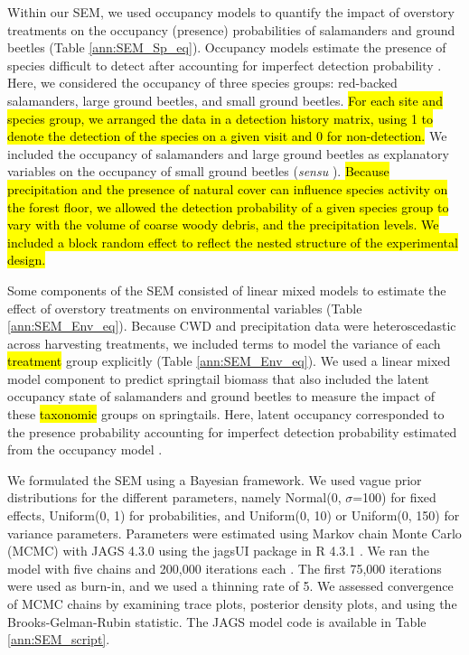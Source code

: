 Within our SEM, we used occupancy models to quantify the impact of overstory treatments on the occupancy (presence) probabilities of salamanders and ground beetles (Table \ref{ann:SEM_Sp_eq}). 
Occupancy models estimate the presence of species difficult to detect after accounting for imperfect detection probability \citep{mackenzieEstimatingSiteOccupancy2002,baileyEstimatingSiteOccupancy2004,mazerolleMakingGreatLeaps2007,spiersEstimatingSpeciesMisclassification2022}. 
Here, we considered the occupancy of three species groups: red-backed salamanders, large ground beetles, and small ground beetles. 
\hl{For each site and species group, we arranged the data in a detection history matrix, using 1 to denote the detection of the species on a given visit and 0 for non-detection. }
We included the occupancy of salamanders and large ground beetles as explanatory variables on the occupancy of small ground beetles (\textit{sensu} \cite{Feldman2023Beaveractivity}). 
\hl{Because precipitation and the presence of natural cover can influence species activity on the forest floor, 
we allowed the detection probability of a given species group to vary with the volume of coarse woody debris, and the precipitation levels. 
We included a block random effect to reflect the nested structure of the experimental design. }

Some components of the SEM consisted of linear mixed models to estimate the effect of overstory treatments on environmental variables (Table \ref{ann:SEM_Env_eq}). 
Because CWD and precipitation data were heteroscedastic across harvesting treatments, we included terms to model the variance of each \hl{treatment} group explicitly (Table \ref{ann:SEM_Env_eq}). 
We used a linear mixed model component to predict springtail biomass that also included the latent occupancy state of salamanders and ground beetles to measure the impact of these \hl{taxonomic} groups on springtails. 
Here, latent occupancy corresponded to the presence probability accounting for imperfect detection probability estimated from the occupancy model \citep{mackenzieOccupancyEstimationModeling2006a}.

We formulated the SEM using a Bayesian framework. 
We used vague prior distributions for the different parameters, namely Normal(0, $\sigma$=100) for fixed effects, Uniform(0, 1) for probabilities, and Uniform(0, 10) or Uniform(0, 150) for variance parameters. 
Parameters were estimated using Markov chain Monte Carlo (MCMC) with JAGS 4.3.0 using the jagsUI package in R 4.3.1 \citep{lunnBUGSProjectEvolution2009,rcoreteamLanguageEnvironmentStatistical2020,kellnerJagsUIWrapperRjags2024}. 
We ran the model with five chains and 200,000 iterations each \citep{gelmanUnderstandingPredictiveInformation2014}. 
The first 75,000 iterations were used as burn-in, and we used a thinning rate of 5. 
We assessed convergence of MCMC chains by examining trace plots, posterior density plots, and using the Brooks-Gelman-Rubin statistic. 
The JAGS model code is available in Table \ref{ann:SEM_script}.

